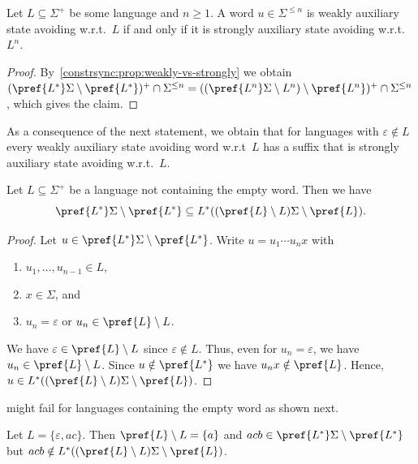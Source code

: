 \begin{corollary} \label{constrsync:cor:weakly-vs-strongly} \label{constrsync:item:Ln2}
	Let $L \subseteq \Sigma^+$ be some language and $n \ge 1$.
	A word $u \in \Sigma^{\le n}$ is weakly auxiliary state avoiding w.r.t.~$L$
	if and only if it is strongly auxiliary state avoiding w.r.t.~$L^n$.	
\end{corollary}
\begin{proof}
	By~\ref{constrsync:prop:weakly-vs-strongly}
	we obtain $( \pref{L^*}\Sigma \setminus \pref{L^*} )^+ \cap \Sigma^{\le n}
	= (( \pref{L^n} \Sigma \setminus L^n ) \setminus \pref{L^n} )^+ \cap \Sigma^{\le n}$,
	which gives the claim.	
\end{proof}

As a consequence of the next statement, we obtain that for languages with $\varepsilon \notin L$
every weakly auxiliary state avoiding word w.r.t~$L$
has a suffix that is strongly auxiliary state avoiding w.r.t.~$L$.

\begin{proposition} \label{constrsync:prop:weakly_suffix_strongly}  \label{item:suffix1}
	Let $L \subseteq \Sigma^+$ be a language not containing the empty word. Then we have
	 \[
	 \pref{L^*}\Sigma  \setminus \pref{L^*} \subseteq  L^* ( ( \pref{L} \setminus L )\Sigma \setminus \pref{L} ).
	 \]
\end{proposition}
\begin{proof}
Let $u \in \pref{L^*}\Sigma  \setminus \pref{L^*}$.
Write $u = u_1 \cdots u_n x$ with
\begin{enumerate}
	\item $u_1, \ldots, u_{n-1} \in L$, 
	
	\item $x \in \Sigma$, and
	
	\item $u_n = \varepsilon$ or $u_n \in \pref{L} \setminus L$.
\end{enumerate}
We have $\varepsilon \in \pref{L} \setminus L$ since $\varepsilon \notin L$.
Thus, even for $u_n = \varepsilon$, we have $u_n \in \pref{L} \setminus L$.
Since $u \notin \pref{L^*}$ we have $u_nx \notin \pref{L}$.
Hence, $u \in L^* ( ( \pref{L} \setminus L )\Sigma \setminus \pref{L} )$.	
\end{proof}

 might fail
for languages containing the empty word as shown next.

\begin{example}
	Let $L = \{\varepsilon, ac\}$.
	Then $\pref{L} \setminus L = \{a\}$
	and $acb \in \pref{L^*}\Sigma \setminus \pref{L^*}$
	but $acb \notin L^* ( ( \pref{L} \setminus L )\Sigma \setminus \pref{L} )$.
\end{example} 

